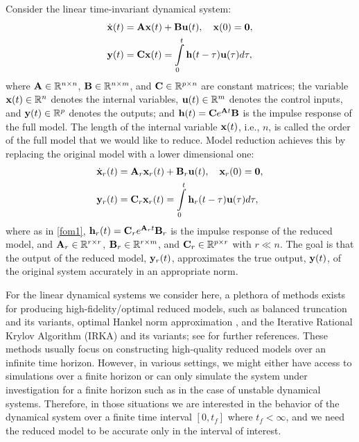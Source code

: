 \documentclass[twocolumn]{autart}
\begin{document}
Consider the linear time-invariant dynamical system:
\begin{equation}  \label{fom1}
\begin{aligned}
\dot{\x}(t) & = \A\x(t) +\B\uu(t),~~~\x(0) = \mathbf{0},\\
\y(t)&= \C\x(t)  = \int_{0}^{t}\h (t-\tau)\uu(\tau) d\tau,
\end{aligned}
\end{equation}
\noindent
where 
$ \mathbf{A} \in \mathbb{R}^{n\times n}$,
 $\mathbf{B}\in \mathbb{R}^{n\times m}$, and $\mathbf{C}\in \mathbb{R}^{p\times n}$ are constant matrices; 
the variable $\mathbf{x}(t)\in \mathbb{R}^n$ denotes the internal variables, $\mathbf{u}(t)\in \mathbb{R}^m$ denotes the control inputs, and $\mathbf{y}(t)\in \mathbb{R}^p$ denotes the outputs; and $\mathbf{h}(t)=\mathbf{C} e^{\mathbf{A} t}\mathbf{B}$ is the impulse response of the full model.   The length of the internal variable $\mathbf{x}(t)$, i.e., $n$, is called the order of the full model that we would like to reduce.  Model
reduction achieves this by replacing the original model with a lower dimensional one:
\begin{equation}  \label{rom1}
\begin{aligned}
\dot{\x}_r(t)&=\A_r\x_r(t)+\B_r\uu(t),~~~\x_r(0) = \mathbf{0},\\
\y_r(t)&=\C_r\x_r(t)  = \int_{0}^{t}\h_r (t-\tau)\uu(\tau)d\tau,
\end{aligned}
\end{equation}
where as in \eqref{fom1}, 
$\mathbf{h}_r(t)=\mathbf{C}_r e^{\mathbf{A}_r t}\mathbf{B}_r$  is the impulse response of the reduced model, and $\mathbf{A}_r \in \mathbb{R}^{r\times r}$, $\mathbf{B}_r\in \mathbb{R}^{r\times m}$, and $\mathbf{C}_r\in \mathbb{R}^{p\times r}$ with $r\ll n$. The goal is that the output of the reduced model, $\mathbf{y}_r(t)$, approximates the true output, $\mathbf{y}(t)$, of the original system accurately in an appropriate norm. 

For the linear dynamical systems we consider here, a plethora of methods exists
for producing high-fidelity/optimal reduced models, such as  balanced truncation \cite{MulR76,Moo81} and its variants, optimal Hankel norm approximation \cite{Glo84}, and the Iterative Rational Krylov Algorithm (IRKA) \cite{GugBA08} and its variants; see \cite{Ant05,BauBF14} for further references.
These methods usually focus on constructing high-quality reduced models  over an infinite time horizon. However, in various settings, we might either have access to simulations over a finite horizon or can only simulate the system under investigation for a finite horizon such as in the case of unstable dynamical systems. Therefore, in those situations we are interested in the behavior of the dynamical system over a finite time interval $[0,t_f]$ where $t_f < \infty$, and we need the reduced model to be accurate only in the interval of interest. 
\end{document}
